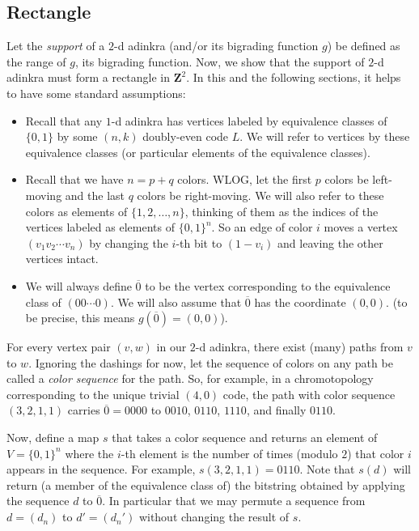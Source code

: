 \documentclass[12pt,twoside,singlespace]{article}
\numberwithin{equation}{section}
\theoremstyle{definition}
\newcommand{\ZZ}{\mathbf{Z}}
\begin{document}
\subsection{Rectangle}

Let the \emph{support} of a $2$-d adinkra (and/or its bigrading function $g$) be defined as the range of $g$, its bigrading function. Now, we show that the support of $2$-d adinkra must form a rectangle in $\ZZ^2$. In this and the following sections, it helps to have some standard assumptions:

\begin{itemize}
\item Recall that any $1$-d adinkra has vertices labeled by equivalence classes of $\{0,1\}$ by some $(n,k)$ doubly-even code $L$. We will refer to vertices by these equivalence classes (or particular elements of the equivalence classes). 
\item Recall that we have $n = p+q$ colors. WLOG, let the first $p$ colors be left-moving and the last $q$ colors be right-moving. We will also refer to these colors as elements of $\{1, 2, \ldots, n\}$, thinking of them as the indices of the vertices labeled as elements of $\{0, 1\}^n$. So an edge of color $i$ moves a vertex $(v_1 v_2 \cdots v_n)$ by changing the $i$-th bit to $(1 - v_i)$ and leaving the other vertices intact. 
\item We will always define $\overline{0}$ to be the vertex corresponding to the equivalence class of $(00\cdots0)$. We will also assume that $\overline{0}$ has the coordinate $(0,0)$. (to be precise, this means $g(\overline{0}) = (0,0)$).
\end{itemize}

For every vertex pair $(v,w)$ in our $2$-d adinkra, there exist (many) paths from $v$ to $w$. Ignoring the dashings for now, let the sequence of colors on any path be called a \emph{color sequence} for the path. So, for example, in a chromotopology corresponding to the unique trivial $(4,0)$ code, the path with color sequence $(3,2,1,1)$ carries $\overline{0} = 0000$ to $0010$, $0110$, $1110$, and finally $0110$. 

Now, define a map $s$ that takes a color sequence and returns an element of $V = \{0,1\}^n$ where the $i$-th element is the number of times (modulo $2$) that color $i$ appears in the sequence. For example, $s(3,2,1,1) = 0110$. Note that $s(d)$ will return (a member of the equivalence class of) the bitstring obtained by applying the sequence $d$ to $\overline{0}$.  In particular that we may permute a sequence from $d = (d_n)$ to $d' = (d_n')$ without changing the result of $s$. 
\end{document}
